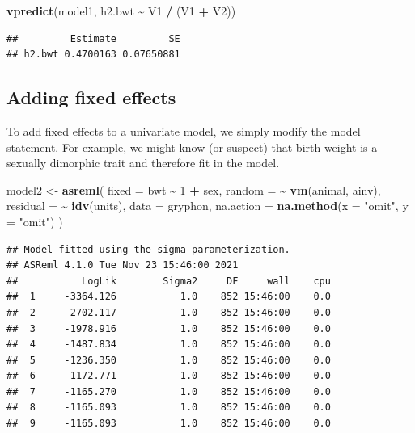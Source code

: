 \documentclass[
  12pt,
]{book}
\newenvironment{Shaded}{\begin{snugshade}}{\end{snugshade}}
\newcommand{\DataTypeTok}[1]{\textcolor[rgb]{0.13,0.29,0.53}{#1}}
\newcommand{\DecValTok}[1]{\textcolor[rgb]{0.00,0.00,0.81}{#1}}
\newcommand{\KeywordTok}[1]{\textcolor[rgb]{0.13,0.29,0.53}{\textbf{#1}}}
\newcommand{\NormalTok}[1]{#1}
\newcommand{\OperatorTok}[1]{\textcolor[rgb]{0.81,0.36,0.00}{\textbf{#1}}}
\newcommand{\StringTok}[1]{\textcolor[rgb]{0.31,0.60,0.02}{#1}}
\begin{document}
\begin{Shaded}
\begin{Highlighting}[]
\KeywordTok{vpredict}\NormalTok{(model1, h2.bwt }\OperatorTok{\textasciitilde{}}\StringTok{ }\NormalTok{V1 }\OperatorTok{/}\StringTok{ }\NormalTok{(V1 }\OperatorTok{+}\StringTok{ }\NormalTok{V2))}
\end{Highlighting}
\end{Shaded}

\begin{verbatim}
##         Estimate         SE
## h2.bwt 0.4700163 0.07650881
\end{verbatim}

\hypertarget{adding-fixed-effects}{%
\subsection{Adding fixed effects}\label{adding-fixed-effects}}

To add fixed effects to a univariate model, we simply modify the model statement. For example, we might know (or suspect) that birth weight is a sexually dimorphic trait and therefore fit in the model.

\begin{Shaded}
\begin{Highlighting}[]
\NormalTok{model2 \textless{}{-}}\StringTok{ }\KeywordTok{asreml}\NormalTok{(}
  \DataTypeTok{fixed =}\NormalTok{ bwt }\OperatorTok{\textasciitilde{}}\StringTok{ }\DecValTok{1} \OperatorTok{+}\StringTok{ }\NormalTok{sex,}
  \DataTypeTok{random =} \OperatorTok{\textasciitilde{}}\StringTok{ }\KeywordTok{vm}\NormalTok{(animal, ainv),}
  \DataTypeTok{residual =} \OperatorTok{\textasciitilde{}}\StringTok{ }\KeywordTok{idv}\NormalTok{(units),}
  \DataTypeTok{data =}\NormalTok{ gryphon,}
  \DataTypeTok{na.action =} \KeywordTok{na.method}\NormalTok{(}\DataTypeTok{x =} \StringTok{"omit"}\NormalTok{, }\DataTypeTok{y =} \StringTok{"omit"}\NormalTok{)}
\NormalTok{)}
\end{Highlighting}
\end{Shaded}

\begin{verbatim}
## Model fitted using the sigma parameterization.
## ASReml 4.1.0 Tue Nov 23 15:46:00 2021
##           LogLik        Sigma2     DF     wall    cpu
##  1     -3364.126           1.0    852 15:46:00    0.0
##  2     -2702.117           1.0    852 15:46:00    0.0
##  3     -1978.916           1.0    852 15:46:00    0.0
##  4     -1487.834           1.0    852 15:46:00    0.0
##  5     -1236.350           1.0    852 15:46:00    0.0
##  6     -1172.771           1.0    852 15:46:00    0.0
##  7     -1165.270           1.0    852 15:46:00    0.0
##  8     -1165.093           1.0    852 15:46:00    0.0
##  9     -1165.093           1.0    852 15:46:00    0.0
\end{verbatim}
\end{document}
